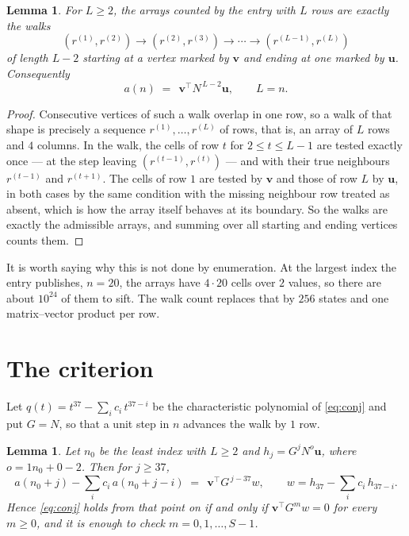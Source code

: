 \documentclass[11pt,a4paper]{article}
\theoremstyle{plain}
\newtheorem{lemma}[theorem]{Lemma}
\theoremstyle{definition}
\begin{document}
\begin{lemma}\label{lem:walk}
For $L\ge2$, the arrays counted by the entry with $L$ rows are exactly the walks
\[
(r^{(1)},r^{(2)})\to(r^{(2)},r^{(3)})\to\cdots\to(r^{(L-1)},r^{(L)})
\]
of length $L-2$ starting at a vertex marked by $\mathbf{v}$ and ending at one marked by
$\mathbf{u}$. Consequently
\[
a(n)\;=\;\,\mathbf{v}^{\!\top}N^{\,L-2}\mathbf{u},\qquad L=n .
\]
\end{lemma}

\begin{proof}
Consecutive vertices of such a walk overlap in one row, so a walk of that shape is
precisely a sequence $r^{(1)},\dots,r^{(L)}$ of rows, that is, an array of $L$ rows
and $4$ columns. In the walk, the cells of row $t$ for $2\le t\le L-1$ are tested
exactly once --- at the step leaving $(r^{(t-1)},r^{(t)})$ --- and with their true
neighbours $r^{(t-1)}$ and $r^{(t+1)}$. The cells of row $1$ are tested by
$\mathbf{v}$ and those of row $L$ by $\mathbf{u}$, in both cases by the same condition
with the missing neighbour row treated as absent, which is how the array itself behaves at
its boundary. So the walks are exactly the admissible arrays, and summing over all starting
and ending vertices counts them.
\end{proof}


It is worth saying why this is not done by enumeration. At the largest index the entry
publishes, $n=20$, the arrays have $4\cdot20$ cells over
$2$ values, so there are about $10^{24}$ of them to sift. The
walk count replaces that by $256$ states and one matrix--vector product per row.
\section{The criterion}

Let $q(t)=t^{37}-\sum_i c_i\,t^{37-i}$ be the characteristic polynomial of
\eqref{eq:conj} and put $G=N$, so that a unit step in $n$ advances the walk by
$1$ row.

\begin{lemma}\label{lem:crit}
Let $n_0$ be the least index with $L\ge2$ and $h_j=G^{j}N^{o}\mathbf{u}$, where
$o=1n_0+0-2$. Then for $j\ge37$,
\[
a(n_0+j)-\sum_i c_i\,a(n_0+j-i)\;=\;\,\mathbf{v}^{\!\top}G^{\,j-37}w,
\qquad w=h_{37}-\sum_i c_i\,h_{37-i} .
\]
Hence \eqref{eq:conj} holds from that point on if and only if
$\mathbf{v}^{\!\top}G^{m}w=0$ for every $m\ge0$, and it is enough to check
$m=0,1,\dots,S-1$.
\end{lemma}
\end{document}
